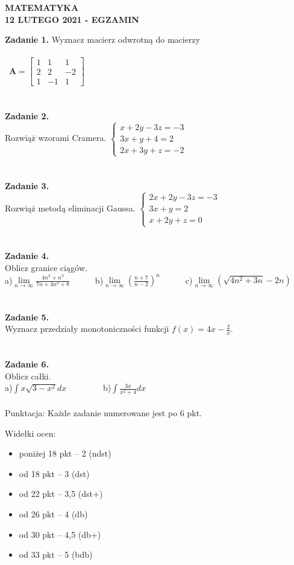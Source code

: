 \documentclass[12pt,a4paper]{report}
\begin{document}
\begin{center}

\textbf{MATEMATYKA \\12 LUTEGO 2021 - EGZAMIN}

\end{center}\textbf{Zadanie 1.} Wyznacz macierz odwrotną do macierzy \\\\\ $\mathbf{A} =\left[ \begin{array}{ccc}1 & 1& 1\\2& 2& -2\\1 & -1& 1\end{array} \right]$\\\\\\\textbf{Zadanie 2.} \\Rozwiąż wzorami Cramera. $\left\{ \begin{array}{ll}x+2y-3z=-3\\ 3x+y+4=2\\2x+3y+z=-2\end{array} \right.$\\\\\\\textbf{Zadanie 3.} \\Rozwiąż metodą eliminacji Gaussa. $\left\{ \begin{array}{ll}2x+2y-3z=-3\\3x+y=2\\x+2y+z=0\end{array} \right.$\\\\\\\textbf{Zadanie 4.} \\Oblicz granice ciągów.\\a)$\lim\limits_{n\to\infty}\frac{4n^2+n^3}{7n+4n^3+8}$\ \ \ \ \ \  b)$\lim\limits_{n\to \infty}(\frac{n+7}{n-2})^n$\ \ \ \ \ \ c)$\lim\limits_{n\to\infty}\left( \sqrt{4n^2+3n}-2n\right)$\\\\\\\textbf{Zadanie 5.} \\Wyznacz przedziały monotoniczności funkcji $f(x)=4x-\frac{2}{x}$.\\\\\\\textbf{Zadanie 6.} \\Oblicz całki. \\a)$\int x\sqrt{3-x^2} dx$ \ \ \ \ \ \ \ \ b)$\int \frac{3x}{x^2+4} dx$\\\\Punktacja: Każde zadanie numerowane jest po 6 pkt.



Widełki ocen:

\begin{itemize}

\item poniżej 18 pkt -- 2 (ndst)

\item od 18 pkt -- 3 (dst)

\item od 22 pkt -- 3,5 (dst+)

\item od 26 pkt -- 4 (db)

\item od 30 pkt -- 4,5 (db+)

\item od 33 pkt -- 5 (bdb)

\end{itemize}
\end{document}
